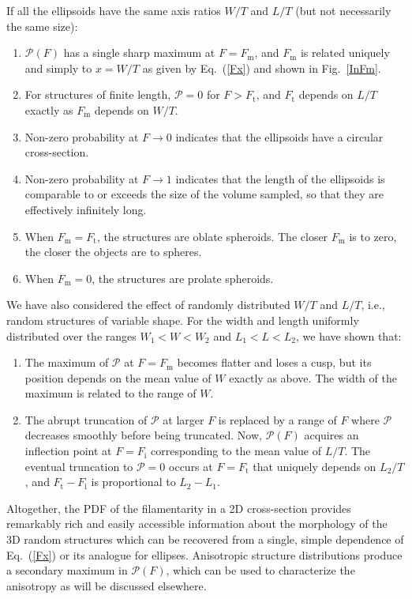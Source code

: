 \documentclass[useAMS,usenatbib]{mn2e}
\newcommand{\mx}{_\mathrm{m}}%
\newcommand{\trunc}{_\mathrm{t}}%
\newcommand{\infl}{_\mathrm{i}}%
\begin{document}
If all the ellipsoids have the same axis ratios $W/T$ and $L/T$ (but not
necessarily the same size):
\begin{enumerate}
\item ${\mathcal P}(F)$ has a single sharp maximum at $F=F\mx$, and $F\mx$ is
related uniquely and simply to $x=W/T$ as given by Eq.~(\ref{Fx}) and shown in
Fig.~\ref{InFm}.

\item For structures of finite length, ${\mathcal P}=0$ for $F>F\trunc$, and
$F\trunc$ depends on $L/T$ exactly as $F\mx$ depends on $W/T$.

\item Non-zero probability at $F\to0$ indicates that the ellipsoids have a
circular cross-section.

\item Non-zero probability at $F\to1$ indicates that the length of the
ellipsoids is comparable to or exceeds the size of the volume sampled, so that
they are effectively infinitely long.

\item When $F\mx=F\trunc$, the structures are oblate spheroids. The closer
$F\mx$ is to zero, the closer the objects are to spheres.

\item When $F\mx = 0$, the structures are prolate spheroids.
\end{enumerate}
We have also considered the effect of randomly distributed $W/T$ and $L/T$,
i.e., random structures of variable shape. For the width and length uniformly
distributed over the ranges $W_1<W<W_2$ and $L_1<L<L_2$, we have shown that:
\begin{enumerate}
\item The maximum of ${\mathcal P}$ at $F=F\mx$ becomes
flatter and loses a cusp, but its position depends on the mean value of $W$
exactly as above. The width of the maximum is related to the range of $W$.

\item The abrupt truncation of ${\mathcal P}$ at larger $F$ is replaced by a
range of $F$ where ${\mathcal P}$ decreases smoothly before being truncated.
Now, ${\mathcal P}(F)$ acquires an inflection point at $F=F\infl$
corresponding to the mean value of $L/T$. The eventual truncation to
${\mathcal P}=0$ occurs at $F=F\trunc$ that uniquely depends on $L_2/T$, and
$F\trunc-F\infl$ is proportional to $L_2-L_1$.
\end{enumerate}

Altogether, the PDF of the filamentarity in a 2D cross-section provides
remarkably rich and easily accessible information about the morphology of the
3D random structures which can be recovered from a single, simple dependence
of Eq.~(\ref{Fx}) or its analogue for ellipses. Anisotropic structure
distributions produce a secondary maximum in ${\mathcal P}(F)$, which can be
used to characterize the anisotropy as will be discussed elsewhere.
\end{document}
